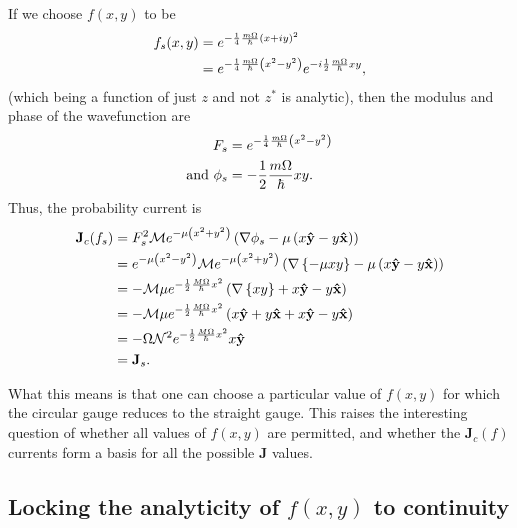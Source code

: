 If we choose $f(x,y)$ to be
\begin{align}
    f_s(x,y) &= e^{- \frac{1}{4} \frac{m \Omega}{\hbar} \left( x + i y \right)^2} \\
             &= e^{- \frac{1}{4} \frac{m \Omega}{\hbar} \left( x^2 - y^2 \right)}
                e^{-i \frac{1}{2} \frac{m \Omega}{\hbar} xy},
\end{align}
(which being a function of just $z$ and not $z^*$ is analytic), then the modulus
and phase of the wavefunction are
\begin{align}
    F_s &= e^{- \frac{1}{4} \frac{m \Omega}{\hbar} \left( x^2 - y^2 \right)} \\
    \mathrm{and}~ \phi_s &= -\frac{1}{2} \frac{m \Omega}{\hbar} xy.
\end{align}
Thus, the probability current is
\begin{align}
    \mathbf{J}_c(f_s)
    &= F_s^2 \mathcal{M} e^{- \mu \left( x^2 + y^2 \right)}
       \left( \nabla \phi_s - \mu \left( x\mathbf{\hat y } -
       y\mathbf{\hat x } \right) \right) \\
    &= e^{- \mu \left( x^2 - y^2 \right)} \mathcal{M} e^{- \mu \left( x^2 + y^2
       \right)} \left( \nabla \left\{ - \mu xy \right\} - \mu \left( x\mathbf{\hat y } - y
       \mathbf{\hat x } \right) \right) \\
    &= - \mathcal{M} \mu e^{- \frac{1}{2} \frac{M
       \Omega}{\hbar} x^2} \left( \nabla \left\{ xy \right\} + x\mathbf{\hat y } -
       y\mathbf{\hat x } \right) \\
    &= - \mathcal{M} \mu e^{- \frac{1}{2} \frac{M
       \Omega}{\hbar} x^2} \left( x\mathbf{\hat y } + y\mathbf{\hat x } + x\mathbf{\hat y } -
       y\mathbf{\hat x } \right) \\
    &= - \Omega \mathcal{N}^2  e^{- \frac{1}{2} \frac{M \Omega}{\hbar} x^2}
       x\mathbf{\hat y } \\
       &= \mathbf{J}_s.
\end{align}

What this means is that one can choose a particular value of $f(x,y)$ for which
the circular gauge reduces to the straight gauge. This raises the interesting
question of whether all values of $f(x,y)$ are permitted, and whether the
$\mathbf{J}_c(f)$ currents form a basis for all the possible $\mathbf{J}$
values.

\subsection{Locking the analyticity of $f(x,y)$ to continuity}

